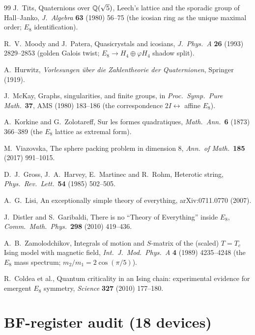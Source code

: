 \documentclass[11pt,a4paper]{article}
\theoremstyle{plain}
\theoremstyle{definition}
\theoremstyle{remark}
\begin{document}
\begin{thebibliography}{99}
 J.~Tits, Quaternions over $\mathbb{Q}(\sqrt5)$, Leech's lattice and the sporadic group of Hall--Janko, \emph{J.\ Algebra} \textbf{63} (1980) 56--75 (the icosian ring as the unique maximal order; $E_8$ identification).

 R.~V.~Moody and J.~Patera, Quasicrystals and icosians, \emph{J.\ Phys.\ A} \textbf{26} (1993) 2829--2853 (golden Galois twist; $E_8 \to H_4 \oplus \varphi H_4$ shadow split).

 A.~Hurwitz, \emph{Vorlesungen \"uber die Zahlentheorie der Quaternionen}, Springer (1919).

 J.~McKay, Graphs, singularities, and finite groups, in \emph{Proc.\ Symp.\ Pure Math.}\ \textbf{37}, AMS (1980) 183--186 (the correspondence $2I \leftrightarrow$ affine $E_8$).

 A.~Korkine and G.~Zolotareff, Sur les formes quadratiques, \emph{Math.\ Ann.}\ \textbf{6} (1873) 366--389 (the $E_8$ lattice as extremal form).

 M.~Viazovska, The sphere packing problem in dimension 8, \emph{Ann.\ of Math.}\ \textbf{185} (2017) 991--1015.

 D.~J.~Gross, J.~A.~Harvey, E.~Martinec and R.~Rohm, Heterotic string, \emph{Phys.\ Rev.\ Lett.}\ \textbf{54} (1985) 502--505.

 A.~G.~Lisi, An exceptionally simple theory of everything, arXiv:0711.0770 (2007).

 J.~Distler and S.~Garibaldi, There is no ``Theory of Everything'' inside $E_8$, \emph{Comm.\ Math.\ Phys.}\ \textbf{298} (2010) 419--436.

 A.~B.~Zamolodchikov, Integrals of motion and $S$-matrix of the (scaled) $T = T_c$ Ising model with magnetic field, \emph{Int.\ J.\ Mod.\ Phys.\ A} \textbf{4} (1989) 4235--4248 (the $E_8$ mass spectrum; $m_2/m_1 = 2\cos(\pi/5)$).

 R.~Coldea et al., Quantum criticality in an Ising chain: experimental evidence for emergent $E_8$ symmetry, \emph{Science} \textbf{327} (2010) 177--180.

\end{thebibliography}

\appendix
\section{BF-register audit (18 devices)}\label{app:bf}
\end{document}
